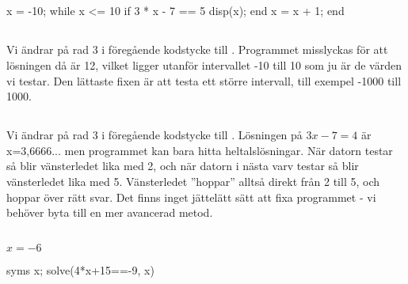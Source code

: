 
\subsection*{}
\vspace{3pt}
\begin{matlab}
x = -10;
while x <= 10
	if 3 * x - 7 == 5
		disp(x);
	end
	x = x + 1;
end
\end{matlab}

\subsection*{}
Vi ändrar på rad 3 i föregående kodstycke till . Programmet misslyckas för att lösningen då är 12, vilket ligger utanför intervallet -10 till 10 som ju är de värden vi testar. Den lättaste fixen är att testa ett större intervall, till exempel -1000 till 1000.

\subsection*{}
Vi ändrar på rad 3 i föregående kodstycke till . Lösningen på $3x-7=4$ är x=3,6666... men programmet kan bara hitta heltalslösningar. När datorn testar  så blir vänsterledet lika med 2, och när datorn i nästa varv testar  så blir vänsterledet lika med 5. Vänsterledet ''hoppar'' alltså direkt från 2 till 5, och hoppar över rätt svar. Det finns inget jättelätt sätt att fixa programmet - vi behöver byta till en mer avancerad metod.

\subsection*{}
$x = -6$
\vspace{10pt}
\begin{matlab}
syms x;
solve(4*x+15==-9, x)
\end{matlab}

